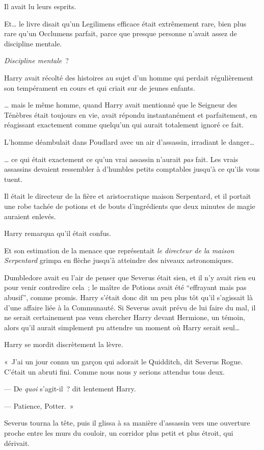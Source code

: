 Il avait lu leurs esprits.

Et… le livre disait qu'un Legilimens efficace était extrêmement rare, bien plus rare qu'un Occlumens parfait, parce que presque personne n'avait assez de discipline mentale.

\emph{Discipline mentale}~?

Harry avait récolté des histoires au sujet d'un homme qui perdait régulièrement son tempérament en cours et qui criait sur de jeunes enfants.

… mais le même homme, quand Harry avait mentionné que le Seigneur des Ténèbres était toujours en vie, avait répondu instantanément et parfaitement, en réagissant exactement comme quelqu'un qui aurait totalement ignoré ce fait.

L'homme déambulait dans Poudlard avec un air d'assassin, irradiant le danger…

… ce qui était exactement ce qu'un vrai assassin n'aurait \emph{pas} fait. Les vrais assassins devaient ressembler à d'humbles petits comptables jusqu'à ce qu'ils vous tuent.

Il était le directeur de la fière et aristocratique maison Serpentard, et il portait une robe tachée de potions et de bouts d'ingrédients que deux minutes de magie auraient enlevés.

Harry remarqua qu'il était confus.

Et son estimation de la menace que représentait \emph{le directeur de la maison Serpentard} grimpa en flèche jusqu'à atteindre des niveaux astronomiques.

Dumbledore avait eu l'air de penser que Severus était sien, et il n'y avait rien eu pour venir contredire cela~; le maître de Potions avait été “effrayant mais pas abusif”, comme promis. Harry s'était donc dit un peu plus tôt qu'il s'agissait là d'une affaire liée à la Communauté. Si Severus avait prévu de lui faire du mal, il ne serait certainement pas venu chercher Harry devant Hermione, un témoin, alors qu'il aurait simplement pu attendre un moment où Harry serait seul…

Harry se mordit discrètement la lèvre.

«~J'ai un jour connu un garçon qui adorait le Quidditch, dit Severus Rogue. C'était un abruti fini. Comme nous nous y serions attendus tous deux.

--- De \emph{quoi} s'agit-il~? dit lentement Harry.

--- Patience, Potter.~»

Severus tourna la tête, puis il glissa à sa manière d'assassin vers une ouverture proche entre les murs du couloir, un corridor plus petit et plus étroit, qui dérivait.

